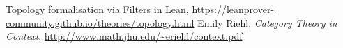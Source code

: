 \documentclass[a4paper, twoside]{book}
\begin{document}











\appendix
%


\begin{thebibliography}{9}
		Topology formalisation via Filters in Lean,
		\url{https://leanprover-community.github.io/theories/topology.html}
		Emily Riehl,
		\textit{Category Theory in Context},
		\url{http://www.math.jhu.edu/~eriehl/context.pdf}
\end{thebibliography}
\end{document}
